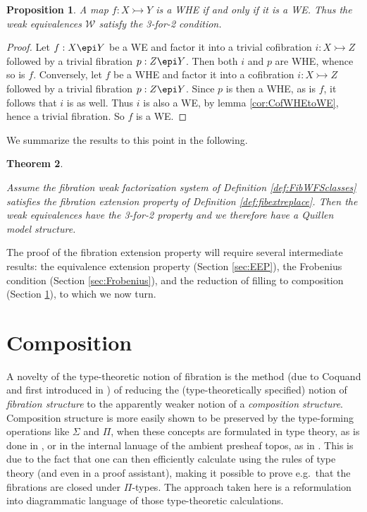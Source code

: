 \documentclass[11pt]{article}
\newcommand{\mono}{\ensuremath{\rightarrowtail}}
\newtheorem{theorem}{Theorem}
\newtheorem{proposition}[theorem]{Proposition}
\theoremstyle{remark}
\theoremstyle{definition}
\begin{document}
\begin{proposition}\label{prop:WHEiffWE}
A map $ f : X \mono Y$ is a WHE if and only if it is a WE.  Thus the weak equivalences $\mathcal{W}$ satisfy the 3-for-2 condition.
\end{proposition}
\begin{proof}
Let $ f : X \epi Y$ be a WE and factor it into a trivial cofibration $i : X\mono Z$ followed by a trivial fibration $p: Z\epi Y$.  Then both 
$i$ and $p$ are WHE, whence so is $f$.  Conversely, let $f$ be a WHE and factor it into a cofibration $i : X\mono Z$ followed by a trivial fibration $p: Z\epi Y$. Since  $p$ is then a WHE, as is $f$, it follows that $i$ is as well.  Thus $i$ is also a WE, by lemma \ref{cor:CofWHEtoWE}, hence a trivial fibration. So $f$ is a WE.
\end{proof}

We summarize the results to this point in the following.
\begin{theorem}\label{theorem:QMSmodFEP}

Assume the fibration weak factorization system of Definition \ref{def:FibWFSclasses} satisfies the fibration extension property of Definition \ref{def:fibextreplace}.  Then the weak equivalences have the 3-for-2 property and we therefore have a Quillen model structure.
\end{theorem}

The proof of the fibration extension property will require several intermediate results: the equivalence extension property (Section \ref{sec:EEP}), the Frobenius condition (Section \ref{sec:Frobenius}), and the reduction of filling to composition (Section \ref{sec:composition}), to which we now turn.

\section{Composition}\label{sec:composition}

A novelty of the type-theoretic notion of fibration is the method (due to Coquand and first introduced in \cite{CCHM}) of reducing the (type-theoretically specified) notion of \emph{fibration structure} to the apparently weaker notion of a \emph{composition structure}.  Composition structure is more easily shown to be preserved by the type-forming operations like $\Sigma$ and $\Pi$, when these concepts are formulated in type theory, as is done in \cite{CCHM}, or in the internal lanuage of the ambient presheaf topos, as in \cite{OP}.  This is due to the fact that one can then efficiently calculate using the rules of type theory (and even in a proof assistant), making it possible to prove e.g.\  that the fibrations are closed under $\Pi$-types.  The approach taken here is a reformulation into diagrammatic language of those type-theoretic calculations.
\end{document}
